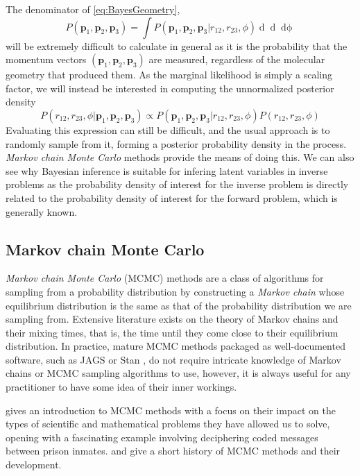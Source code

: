 The denominator of \eqref{eq:BayesGeometry},
\begin{equation}
  P(\mathbf{p}_1, \mathbf{p}_2, \mathbf{p}_3) =
    \int P(\mathbf{p}_1, \mathbf{p}_2, \mathbf{p}_3|r_{12}, r_{23}, \phi)
    \mathop{dr_{12}} \mathop{dr_{23}} \mathop{d\phi}
\end{equation}
will be extremely difficult to calculate in general as it is the probability that the momentum vectors $(\mathbf{p}_1, \mathbf{p}_2, \mathbf{p}_3)$ are measured, regardless of the molecular geometry that produced them. As the marginal likelihood is simply a scaling factor, we will instead be interested in computing the unnormalized posterior density
\begin{equation} 
  P(r_{12}, r_{23}, \phi|\mathbf{p}_1, \mathbf{p}_2, \mathbf{p}_3) \propto P(\mathbf{p}_1, \mathbf{p}_2, \mathbf{p}_3|r_{12}, r_{23}, \phi) P(r_{12}, r_{23}, \phi)
\end{equation}
Evaluating this expression can still be difficult, and the usual approach is to randomly sample from it, forming a posterior probability density in the process. \emph{Markov chain Monte Carlo} methods provide the means of doing this. We can also see why Bayesian inference is suitable for infering latent variables in inverse problems as the probability density of interest for the inverse problem is directly related to the probability density of interest for the forward problem, which is generally known.

\subsection{Markov chain Monte Carlo}
\emph{Markov chain Monte Carlo} (MCMC) methods are a class of algorithms for sampling from a probability distribution by constructing a \emph{Markov chain} whose equilibrium distribution is the same as that of the probability distribution we are sampling from. Extensive literature exists on the theory of Markov chains \citep{Levin09} and their mixing times, that is, the time until they come close to their equilibrium distribution. In practice, mature MCMC methods packaged as well-documented software, such as JAGS \citep{Plummer03} or Stan \citep{Carpenter17}, do not require intricate knowledge of Markov chains or MCMC sampling algorithms to use, however, it is always useful for any practitioner to have some idea of their inner workings.

\citet{Diaconis09} gives an introduction to MCMC methods with a focus on their impact on the types of scientific and mathematical problems they have allowed us to solve, opening with a fascinating example involving deciphering coded messages between prison inmates. \citet{Richey10} and \citet{Robert11} give a short history of MCMC methods and their development.

